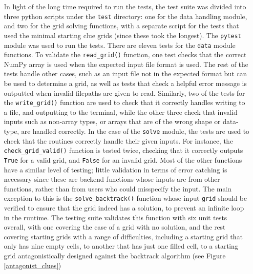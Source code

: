 \documentclass[12pt]{article}
\begin{document}
In light of the long time required to run the tests, the test suite was divided into three python scripts under the \texttt{test} directory: one for the data handling module, and two for the grid solving functions, with a separate script for the tests that used the minimal starting clue grids (since these took the longest).
The \texttt{pytest} module was used to run the tests.
There are eleven tests for the \texttt{data} module functions.
To validate the \texttt{read\_grid()} function, one test checks that the correct NumPy array is used when the expected input file format is used.
The rest of the tests handle other cases, such as an input file not in the expected format but can be used to determine a grid, as well as tests that check a helpful error message is outputted when invalid filepaths are given to read.
Similarly, two of the tests for the \texttt{write\_grid()} function are used to check that it correctly handles writing to a file, and outputting to the terminal, while the other three check that invalid inputs such as non-array types, or arrays that are of the wrong shape or data-type, are handled correctly.
In the case of the \texttt{solve} module, the tests are used to check that the routines correctly handle their given inputs.
For instance, the \texttt{check\_grid\_valid()} function is tested twice, checking that it correctly outputs \texttt{True} for a valid grid, and \texttt{False} for an invalid grid.
Most of the other functions have a similar level of testing; little validation in terms of error catching is necessary since these are backend functions whose inputs are from other functions, rather than from users who could misspecify the input.
The main exception to this is the \texttt{solve\_backtrack()} function whose input \texttt{grid} should be verified to ensure that the grid indeed has a solution, to prevent an infinite loop in the runtime.
The testing suite validates this function with six unit tests overall, with one covering the case of a grid with no solution, and the rest covering starting grids with a range of difficulties, including a starting grid that only has nine empty cells, to another that has just one filled cell, to a starting grid antagonistically designed against the backtrack algorithm (see Figure \ref{antagonist_clues})
\end{document}
